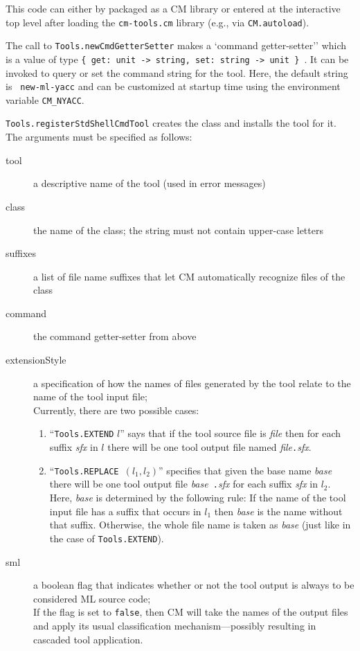 \documentclass{article}
\begin{document}
This code can either by packaged as a CM library or entered at the
interactive top level after loading the {\tt cm-tools.cm} library
(e.g., via {\tt CM.autoload}).

The call to {\tt Tools.newCmdGetterSetter} makes a `command
getter-setter'' which is a value of type {\tt \{ get: unit -> string,
set: string -> unit \} }. It can be invoked to query or set the
command string for the tool.  Here, the default string is {\tt
new-ml-yacc} and can be customized at startup time using the
environment variable {\tt CM\_NYACC}.

{\tt Tools.registerStdShellCmdTool} creates the class and installs the
tool for it.  The arguments must be specified as follows:

\begin{description}
\item[tool] a descriptive name of the tool (used in error messages)
\item[class] the name of the class; the string must not contain
upper-case letters
\item[suffixes] a list of file name suffixes that let CM automatically
recognize files of the class
\item[command] the command getter-setter from above
\item[extensionStyle] a specification of how the names of files
generated by the tool relate to the name of the tool input file; \\
Currently, there are two possible cases:
\begin{enumerate}
\item ``{\tt Tools.EXTEND} $l$'' says that if the tool source file is
{\it file} then for each suffix {\it sfx} in $l$ there will be one tool
output file named {\it file}{\tt .}{\it sfx}.
\item ``{\tt Tools.REPLACE }$(l_1, l_2)$'' specifies that given the
base name {\it base} there will be one tool output file {\it base}{\tt
.}{\it sfx} for each suffix {\it sfx} in $l_2$.  Here, {\it base} is
determined by the following rule:  If the name of the tool input file
has a suffix that occurs in $l_1$ then {\it base} is the name without
that suffix.  Otherwise, the whole file name is taken as {\it base}
(just like in the case of {\tt Tools.EXTEND}).
\end{enumerate}
\item[sml] a boolean flag that indicates whether or not the tool
output is always to be considered ML source code; \\
If the flag is set to {\tt false}, then CM will take the names of the
output files and apply its usual classification mechanism---possibly
resulting in cascaded tool application.
\end{description}
\end{document}
